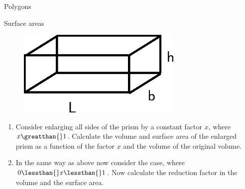 \begin{exercises}{Polygons}
\begin{exercises}{Surface areas }
{\begin{mdframed}[linewidth=4, leftmargin=40, rightmargin=40]
\begin{exercise}
    \setcounter{subfigure}{0}


	\begin{figure}[H] %
    \begin{center}
    \label{m39357*id63644!!!underscore!!!media}\label{m39357*id63644!!!underscore!!!printimage}\includegraphics[width=300px]{col11306.imgs/m39357_MG10C14_009.png} %
        
      \vspace{2pt}
    \vspace{.1in}
    
    \end{center}

 \end{figure}   

    \addtocounter{footnote}{-0}
    
        \par 
        \label{m39357*id63651}\begin{enumerate}[noitemsep, label=\textbf{\arabic*}. ] 
            \leftskip=20pt\rightskip=\leftskip\label{m39357*uid21}\item Consider enlarging all sides of the prism by a constant factor $x$, where $x\greatthan{}1$. Calculate the volume and surface area of the enlarged prism as a function of the factor $x$ and the volume of the original volume.
\label{m39357*uid22}\item In the same way as above now consider the case, where $0\lessthan{}x\lessthan{}1$. Now calculate the reduction factor in the volume and the surface area.
\end{enumerate}
        

\end{exercise}
\end{mdframed}}
\end{exercises}
\end{exercises}
